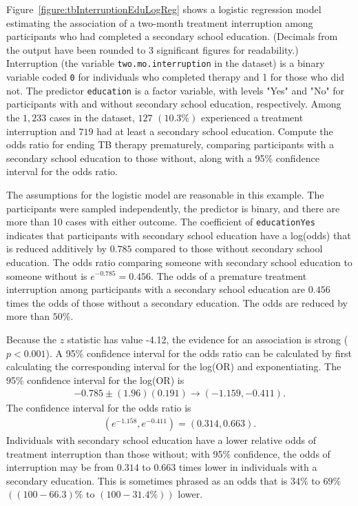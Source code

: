 \begin{examplewrap} 
  \begin{nexample}  {Figure~\ref{figure:tbInterruptionEduLogReg} shows a logistic regression model estimating the association of a two-month treatment interruption among participants who had completed a secondary school education. (Decimals from the output have been rounded to 3 significant figures for readability.) Interruption (the variable \texttt{two.mo.interruption} in the dataset) is a binary variable coded \texttt{0} for individuals who completed therapy and 1 for those who did not. The predictor \texttt{education} is a factor variable, with levels {"Yes"} and {"No"} for participants with and without secondary school education, respectively.  Among the $1,233$ cases in the dataset, $127$ $(10.3\%)$ experienced a treatment interruption and $719$ had at least a secondary school education. Compute the odds ratio for ending TB therapy prematurely, comparing participants with a secondary school education to those without, along with a 95\% confidence interval for the odds ratio.}

The assumptions for the logistic model are reasonable in this example. The participants were sampled independently, the predictor is binary, and there are more than 10 cases with either outcome.  The coefficient of \texttt{educationYes} indicates that participants with secondary school education have a log(odds) that is reduced additively by $0.785$ compared to those without secondary school education.  The odds ratio comparing someone with secondary school education to someone without is $e^{-0.785}=0.456$.  The odds of a premature treatment interruption among participants with a secondary school education are $0.456$ times the odds of those without a secondary education.  The odds are reduced by more than $50\%$.

Because the $z$ statistic has value -4.12, the evidence for an association is strong ($p < 0.001$).  A 95\% confidence interval for the odds ratio can be calculated by first calculating the corresponding interval for the log(OR) and exponentiating.  The 95\% confidence interval for the log(OR) is
\begin{align*}
  -0.785 \pm (1.96)(0.191) \longrightarrow (-1.159,-0.411).
\end{align*}
The confidence interval for the odds ratio is
\begin{align*}
  (e^{-1.158}, e^{-0.411}) = (0.314,0.663).
\end{align*}
    Individuals with secondary school education have a lower relative odds of treatment interruption than those without; with 95\% confidence, the odds of interruption may be from $0.314$ to $0.663$ times lower in individuals with a secondary education.  This is sometimes phrased as an odds that is $34\%$ to $69\%$ $((100 - 66.3)\% \text{ to } (100 - 31.4\%))$ lower.
\label{example:tbInterruptionEducation}
\end{nexample}
\end{examplewrap}


